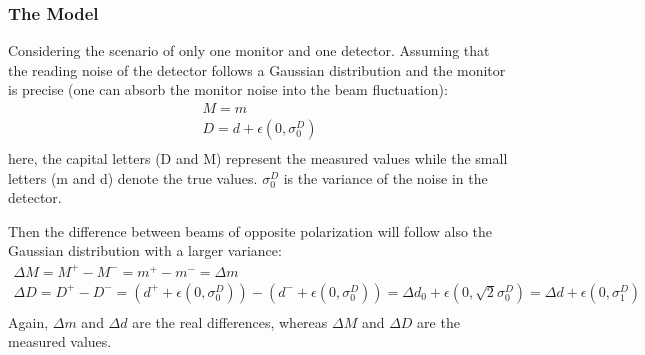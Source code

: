 \begin{comment}
For example, the famous least square fit is actually a linear regression 
$$ Y = c_0 + \sum c_i x_i + \epsilon $$
assuming Gaussian distribution of the dependent variable: $\epsilon \sim N(0, \sigma)$
Another frequently used scene is logistic regression for classification, which
is very similar to linear regression except f(X) will be converted into a
probability function, e.g. using the logistic function:
$$ h(z) = \frac{e^z}{1 + e^z} \quad z = f(X) $$

The assumption we made here is that the fluctuations in beam parameters in small, 
compared to their normal yield -- this can be verified by their yield plot. So
that we can use first order fit to model the detector's response to change in
beam parameters. Therefore the `true' asymmetry will be:
\begin{equation}
    \CA_{cor} = \CA_{raw} - \sum_i \beta_i\Delta M_i
\end{equation}
where $\CA_{cor}$ is the corrected asymmetry, $\beta_i = \frac{\partial \CA_{raw}}{\Delta M_i}$ 
is the slope and $\Delta M$ is the difference of BPM yield between 
opposite helicities windows, i sums over all 5 chosen BPMs.
\end{comment}

\subsubsection{The Model}
Considering the scenario of only one monitor and one detector. 
Assuming that the reading noise of the detector
follows a Gaussian distribution and the monitor is precise (one can absorb the monitor
noise into the beam fluctuation):
\begin{equation}
    \begin{gathered}
	M = m	\\
	D = d + \epsilon(0, \sigma_0^D)    \\
    \end{gathered}
\end{equation}
here, the capital letters (D and M) represent the measured values while the 
small letters (m and d) denote the true values. $\sigma_0^D$ 
is the variance of the noise in the detector.

Then the difference between beams of opposite polarization will follow also
the Gaussian distribution with a larger variance:
\begin{equation}
    \begin{gathered}
	\Delta M = M^+ - M^- = m^+ - m^- = \Delta m   \\
	\Delta D = D^+ - D^- = (d^+ + \epsilon(0, \sigma_0^D)) - (d^- + \epsilon(0, \sigma_0^D))
	    = \Delta d_0 + \epsilon(0, \sqrt{2}\sigma_0^D)
	    = \Delta d + \epsilon(0, \sigma_1^D) \\
    \end{gathered}
\end{equation}
Again, $\Delta m$ and $\Delta d$ are the real differences,
whereas $\Delta M$ and $\Delta D$ are the measured values.

